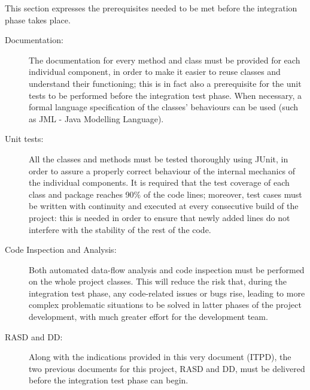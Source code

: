 This section expresses the prerequisites needed to be met before the integration phase takes place.

\begin{description}
\item[Documentation:] The documentation for every method and class must be provided for each individual component, in order to make it easier to reuse classes and understand their functioning; this is in fact also a prerequisite for the unit tests to be performed before the integration test phase. When necessary, a formal language specification of the classes' behaviours can be used (such as JML - Java Modelling Language).
\item[Unit tests:] All the classes and methods must be tested thoroughly using JUnit, in order to assure a properly correct behaviour of the internal mechanics of the individual components. It is required that the test coverage of each class and package reaches 90\% of the code lines; moreover, test cases must be written with continuity and executed at every consecutive build of the project: this is needed in order to ensure that newly added lines do not interfere with the stability of the rest of the code.
\item[Code Inspection and Analysis:] Both automated data-flow analysis and code inspection must be performed on the whole project classes. This will reduce the risk that, during the integration test phase, any code-related issues or bugs rise, leading to more complex problematic situations to be solved in latter phases of the project development, with much greater effort for the development team.
\item[RASD and DD:] Along with the indications provided in this very document (ITPD), the two previous documents for this project, RASD and DD, must be delivered before the integration test phase can begin.
\end{description}